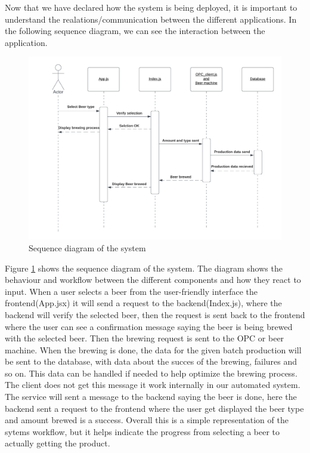 Now that we have declared how the system is being deployed, it is important to understand the realations/communication between the different applications. In the following sequence diagram, we can see the interaction between the application.

\begin{center}
    \centering
    \begin{figure}[H]
        \includegraphics[width=1\textwidth]{img/SQdiagram_implementation.png}
        \caption{Sequence diagram of the system}
        \label{fig:SQdiagram_implementation}
    \end{figure}
\end{center}

Figure \ref{fig:SQdiagram_implementation} shows the sequence diagram of the system. The diagram shows the behaviour and workflow between the different components and how they react to input. When a user selects a beer from the user-friendly interface the frontend(App.jsx) it will send a request to the backend(Index.js), where the backend will verify the selected beer, then the request is sent back to the frontend where the user can see a confirmation message saying the beer is being brewed with the selected beer. Then the brewing request is sent to the OPC or beer machine.
When the brewing is done, the data for the given batch production will be sent to the database, with data about the succes of the brewing, failures and so on. This data can be handled if needed to help optimize the brewing process. The client does not get this message it work internally in our automated system. The service will sent a message to the backend saying the beer is done, here the backend sent a request to the frontend where the user get displayed the beer type and amount brewed is a success.
Overall this is a simple representation of the sytems workflow, but it helps indicate the progress from selecting a beer to actually getting the product.

